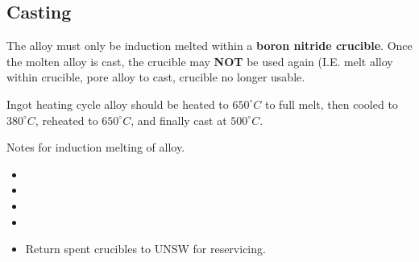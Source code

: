 \subsection{Casting}

The \MgZnCa alloy must only be induction melted within a \textbf{boron nitride crucible}. Once the molten alloy is cast, the crucible may \textbf{NOT} be used again (I.E. melt alloy within crucible, pore alloy to cast, crucible no longer usable. 

Ingot heating cycle
\MgZnCa alloy should be heated to $650^{\circ}C$ to full melt, then cooled to $380^{\circ}C$, reheated to $650^{\circ}C$, and finally cast at $500^{\circ}C$. 

Notes for induction melting of \MgZnCa alloy.
\begin{itemize}
\item 
\item 
\item 
\item
\item Return spent crucibles to UNSW for reservicing. 
\end{itemize}